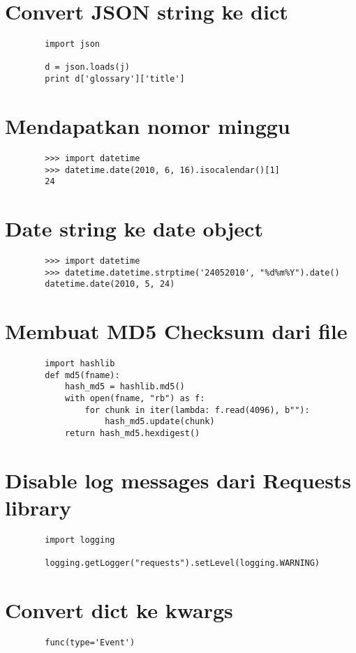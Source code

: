 \documentclass{article}
\begin{document}
	\section {Convert JSON string ke dict}
	\begin{lstlisting}
		import json
		
		d = json.loads(j)
		print d['glossary']['title']
	\end{lstlisting}

	\section {Mendapatkan nomor minggu}
	\begin{lstlisting}
		>>> import datetime
		>>> datetime.date(2010, 6, 16).isocalendar()[1]
		24
	\end{lstlisting}

	\section {Date string ke date object}
	\begin{lstlisting}
		>>> import datetime
		>>> datetime.datetime.strptime('24052010', "%d%m%Y").date()
		datetime.date(2010, 5, 24)
	\end{lstlisting}

	\section {Membuat MD5 Checksum dari file}
	\begin{lstlisting}
		import hashlib
		def md5(fname):
			hash_md5 = hashlib.md5()
			with open(fname, "rb") as f:
				for chunk in iter(lambda: f.read(4096), b""):
					hash_md5.update(chunk)
			return hash_md5.hexdigest()
	\end{lstlisting}

	\section {Disable log messages dari Requests library}
	\begin{lstlisting}
		import logging
		
		logging.getLogger("requests").setLevel(logging.WARNING)
	\end{lstlisting}

	\section {Convert dict ke kwargs}
	\begin{lstlisting}
		func(type='Event')
	\end{lstlisting}
\end{document}
